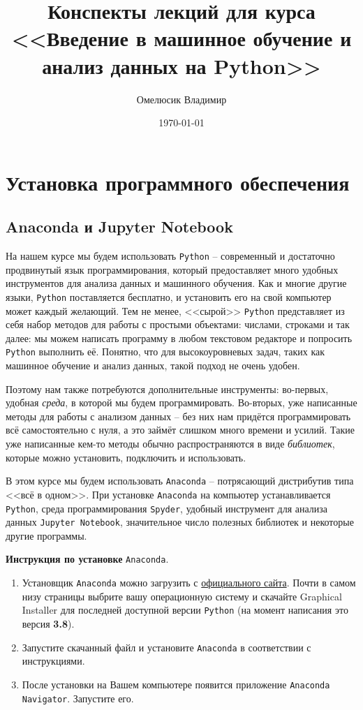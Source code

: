 \documentclass[11pt, a4paper]{extarticle}
\title{Конспекты лекций для курса \\ <<Введение в машинное обучение и анализ данных на Python>>}
\author{Омелюсик Владимир}
\date{\today}
\begin{document}
	
	\maketitle
	\tableofcontents
	
	\section{Установка программного обеспечения}
	
	\subsection{Anaconda и Jupyter Notebook}
	На нашем курсе мы будем использовать \lstinline|Python| -- современный и достаточно продвинутый язык программирования, который предоставляет много удобных инструментов для анализа данных и машинного обучения.
	Как и многие другие языки, \lstinline|Python| поставляется бесплатно, и установить его на свой компьютер может каждый желающий.
	Тем не менее, <<сырой>> \lstinline|Python| представляет из себя набор методов для работы с простыми объектами: числами, строками и так далее: мы можем написать программу в любом текстовом редакторе и попросить \lstinline|Python| выполнить её.
	Понятно, что для высокоуровневых задач, таких как машинное обучение и анализ данных, такой подход не очень удобен.
	
	Поэтому нам также потребуются дополнительные инструменты: во-первых, удобная \textit{среда}, в которой мы будем программировать. 
	Во-вторых, уже написанные методы для работы с анализом данных -- без них нам придётся программировать всё самостоятельно с нуля, а это займёт слишком много времени и усилий.
	Такие уже написанные кем-то методы обычно распространяются в виде \textit{библиотек}, которые можно установить, подключить и использовать.
	
	В этом курсе мы будем использовать \lstinline|Anaconda| -- потрясающий дистрибутив типа <<всё в одном>>.
	При установке \lstinline|Anaconda| на компьютер устанавливается \lstinline|Python|, среда программирования \lstinline|Spyder|, удобный инструмент для анализа данных \lstinline|Jupyter Notebook|, значительное число полезных библиотек и некоторые другие программы.
	
	\begin{shaded}
	\textbf{Инструкция по установке} \lstinline|Anaconda|.
	\begin{enumerate}
		\item Установщик \lstinline|Anaconda| можно загрузить с \href{https://www.anaconda.com/products/individual}{официального сайта}.
		Почти в самом низу страницы выбрите вашу операционную систему и скачайте Graphical Installer для последней доступной версии \lstinline|Python| (на момент написания это версия \textbf{3.8}).
		\item Запустите скачанный файл и установите \lstinline|Anaconda| в соответствии с инструкциями.
		\item После установки на Вашем компьютере появится приложение \lstinline|Anaconda Navigator|. Запустите его.
	\end{enumerate}
	\end{shaded}
\end{document}

